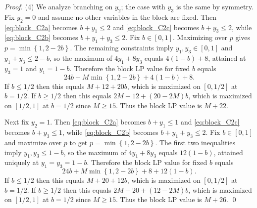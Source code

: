 \documentclass[10pt,a4paper]{amsart}
\newcommand{\set}[1]{\left\{#1\right\}}
\begin{document}
\begin{proof}
	\smallskip
	(4) We analyze branching on $y_2$; the case with $y_3$ is the same by symmetry.
	Fix $y_2=0$ and assume no other variables in the block are fixed.
	Then \eqref{eq:block_C2a} becomes $b+y_1\le 2$ and \eqref{eq:block_C2c} becomes $b+y_3\le 2$, while
	\eqref{eq:block_C2b} becomes $b+y_1+y_3\le 2$.
	Fix $b\in[0,1]$.
	Maximizing over $p$ gives $p=\min\set{1,2-2b}$.
	The remaining constraints imply $y_1,y_3\in[0,1]$ and $y_1+y_3\le 2-b$, so the maximum of
	$4y_1+8y_3$ equals $4(1-b)+8$, attained at $y_3=1$ and $y_1=1-b$.
	Therefore the block LP value for fixed $b$ equals
	\[
		24b+M\min\set{1,2-2b}+4(1-b)+8.
	\]
	If $b\le 1/2$ then this equals $M+12+20b$, which is maximized on $[0,1/2]$ at $b=1/2$.
		If $b\ge 1/2$ then this equals $2M+12+(20-2M)b$, which is maximized on $[1/2,1]$ at $b=1/2$ since $M\ge 15$.
	Thus the block LP value is $M+22$.

	Next fix $y_2=1$.
	Then \eqref{eq:block_C2a} becomes $b+y_1\le 1$ and \eqref{eq:block_C2c} becomes $b+y_3\le 1$, while
	\eqref{eq:block_C2b} becomes $b+y_1+y_3\le 2$.
	Fix $b\in[0,1]$ and maximize over $p$ to get $p=\min\set{1,2-2b}$.
	The first two inequalities imply $y_1,y_3\le 1-b$, so the maximum of $4y_1+8y_3$ equals $12(1-b)$,
	attained uniquely at $y_1=y_3=1-b$.
	Therefore the block LP value for fixed $b$ equals
	\[
		24b+M\min\set{1,2-2b}+8+12(1-b).
	\]
	If $b\le 1/2$ then this equals $M+20+12b$, which is maximized on $[0,1/2]$ at $b=1/2$.
		If $b\ge 1/2$ then this equals $2M+20+(12-2M)b$, which is maximized on $[1/2,1]$ at $b=1/2$ since $M\ge 15$.
	Thus the block LP value is $M+26$.
\qed
\end{proof}
\end{document}
